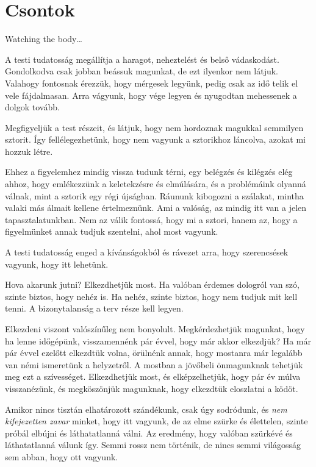 \hypertarget{csontok-1}{%
\chapter{Csontok}\label{csontok-1}}

Watching the body\ldots{}

A testi tudatosság megállítja a haragot, neheztelést és belső
vádaskodást. Gondolkodva csak jobban beássuk magunkat, de ezt ilyenkor
nem látjuk. Valahogy fontosnak érezzük, hogy mérgesek legyünk, pedig
csak az idő telik el vele fájdalmasan. Arra vágyunk, hogy vége legyen és
nyugodtan mehessenek a dolgok tovább.

Megfigyeljük a test részeit, és látjuk, hogy nem hordoznak magukkal
semmilyen sztorit. Így fellélegezhetünk, hogy nem vagyunk a sztorikhoz
láncolva, azokat mi hozzuk létre.

Ehhez a figyelemhez mindig vissza tudunk térni, egy belégzés és kilégzés
elég ahhoz, hogy emlékezzünk a keletekzésre és elmúlására, és a
problémáink olyanná válnak, mint a sztorik egy régi újságban. Ráununk
kibogozni a szálakat, mintha valaki más álmait kellene értelmeznünk. Ami
a valóság, az mindig itt van a jelen tapasztalatunkban. Nem az válik
fontossá, hogy mi a sztori, hanem az, hogy a figyelmünket annak tudjuk
szentelni, ahol most vagyunk.

A testi tudatosság enged a kívánságokból és rávezet arra, hogy
szerencsések vagyunk, hogy itt lehetünk.

Hova akarunk jutni? Elkezdhetjük most. Ha valóban érdemes dologról van
szó, szinte biztos, hogy nehéz is. Ha nehéz, szinte biztos, hogy nem
tudjuk mit kell tenni. A bizonytalanság a terv része kell legyen.

Elkezdeni viszont valószínűleg nem bonyolult. Megkérdezhetjük magunkat,
hogy ha lenne időgépünk, visszamennénk pár évvel, hogy már akkor
elkezdjük? Ha már pár évvel ezelőtt elkezdtük volna, örülnénk annak,
hogy mostanra már legalább van némi ismeretünk a helyzetről. A mostban a
jövőbeli önmagunknak tehetjük meg ezt a szívességet. Elkezdhetjük most,
és elképzelhetjük, hogy pár év múlva visszanézünk, és megköszönjük
magunknak, hogy elkezdtük eloszlatni a ködöt.

Amikor nincs tisztán elhatározott szándékunk, csak úgy sodródunk, és
\emph{nem kifejezetten zavar} minket, hogy itt vagyunk, de az elme
szürke és élettelen, szinte próbál elbújni és láthatatlanná válni. Az
eredmény, hogy valóban szürkévé és láthatatlanná válunk így. Semmi rossz
nem történik, de nincs semmi világosság sem abban, hogy ott vagyunk.

